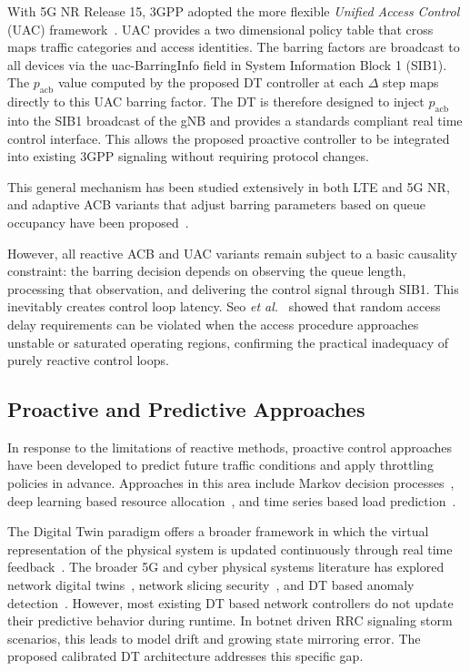 \documentclass[conference]{IEEEtran}
\newcommand{\pacb}{p_{\mathrm{acb}}}
\begin{document}
With 5G NR Release 15, 3GPP adopted the more flexible \emph{Unified Access Control} (UAC) framework~\cite{b4}. UAC provides a two dimensional policy table that cross maps traffic categories and access identities. The barring factors are broadcast to all devices via the uac-BarringInfo field in System Information Block 1 (SIB1). The $\pacb$ value computed by the proposed DT controller at each $\Delta$ step maps directly to this UAC barring factor. The DT is therefore designed to inject $\pacb$ into the SIB1 broadcast of the gNB and provides a standards compliant real time control interface. This allows the proposed proactive controller to be integrated into existing 3GPP signaling without requiring protocol changes.

This general mechanism has been studied extensively in both LTE and 5G NR, and adaptive ACB variants that adjust barring parameters based on queue occupancy have been proposed~\cite{b5}.

However, all reactive ACB and UAC variants remain subject to a basic causality constraint: the barring decision depends on observing the queue length, processing that observation, and delivering the control signal through SIB1. This inevitably creates control loop latency. Seo \emph{et al.}~\cite{b6} showed that random access delay requirements can be violated when the access procedure approaches unstable or saturated operating regions, confirming the practical inadequacy of purely reactive control loops.

\subsection{Proactive and Predictive Approaches}

In response to the limitations of reactive methods, proactive control approaches have been developed to predict future traffic conditions and apply throttling policies in advance. Approaches in this area include Markov decision processes~\cite{b7}, deep learning based resource allocation~\cite{b8}, and time series based load prediction~\cite{b9}.

The Digital Twin paradigm offers a broader framework in which the virtual representation of the physical system is updated continuously through real time feedback~\cite{b10}. The broader 5G and cyber physical systems literature has explored network digital twins~\cite{b11}, network slicing security~\cite{b12}, and DT based anomaly detection~\cite{b13}. However, most existing DT based network controllers do not update their predictive behavior during runtime. In botnet driven RRC signaling storm scenarios, this leads to model drift and growing state mirroring error. The proposed calibrated DT architecture addresses this specific gap.
\end{document}
